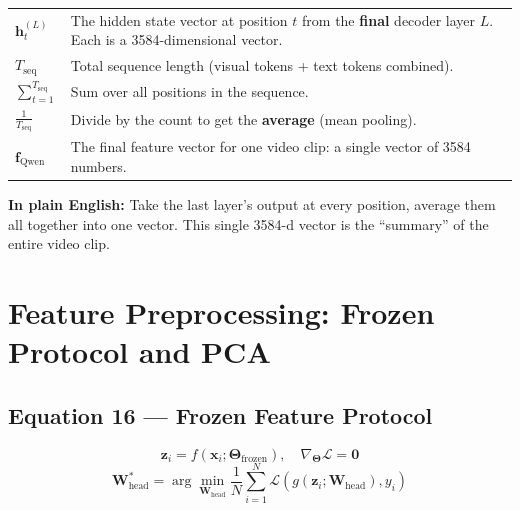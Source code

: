 \documentclass[12pt, a4paper]{article}
\begin{document}
\begin{explainbox}
\begin{tabular}{lp{11cm}}
$\mathbf{h}_t^{(L)}$ & The hidden state vector at position $t$ from the \textbf{final} decoder layer $L$. Each is a 3584-dimensional vector.\\[0.2cm]
$T_{\text{seq}}$ & Total sequence length (visual tokens + text tokens combined).\\[0.2cm]
$\sum_{t=1}^{T_{\text{seq}}}$ & Sum over all positions in the sequence.\\[0.2cm]
$\frac{1}{T_{\text{seq}}}$ & Divide by the count to get the \textbf{average} (mean pooling).\\[0.2cm]
$\mathbf{f}_{\text{Qwen}}$ & The final feature vector for one video clip: a single vector of 3584 numbers.
\end{tabular}

\textbf{In plain English:} Take the last layer's output at every position, average them all together into one vector. This single 3584-d vector is the ``summary'' of the entire video clip.
\end{explainbox}


\newpage
\section{Feature Preprocessing: Frozen Protocol and PCA}

\subsection{Equation 16 --- Frozen Feature Protocol}

\begin{eqbox}
\[
\mathbf{z}_i = f(\mathbf{x}_i; \mathbf{\Theta}_{\text{frozen}}), \quad \nabla_{\mathbf{\Theta}} \mathcal{L} = \mathbf{0}
\]
\[
\mathbf{W}_{\text{head}}^* = \arg\min_{\mathbf{W}_{\text{head}}} \frac{1}{N}\sum_{i=1}^{N} \mathcal{L}\left( g(\mathbf{z}_i; \mathbf{W}_{\text{head}}), y_i \right)
\]
\end{eqbox}
\end{document}
